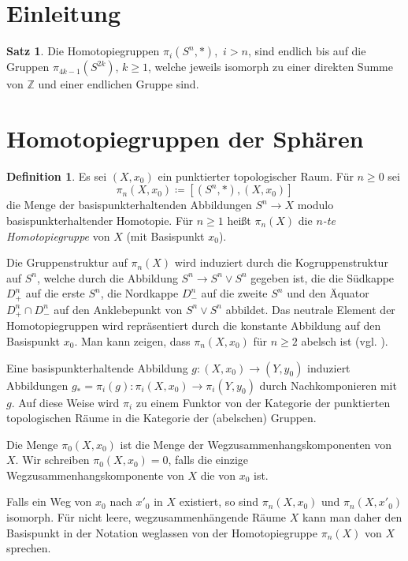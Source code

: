 \documentclass[11pt, a4paper, german]{article}
\theoremstyle{definition}
\newtheorem{satz}{Satz}
\newtheorem{defn}{Definition}
\theoremstyle{remark}
\newcommand{\Z}{\mathbb{Z}} %
\begin{document}


\tableofcontents
\newpage

\section{Einleitung}

\begin{satz}
  Die Homotopiegruppen $\pi_i(S^n, *)$,~$i > n$, sind endlich bis auf die Gruppen $\pi_{4k-1}(S^{2k})$, $k \geq 1$, welche jeweils isomorph zu einer direkten Summe von $\Z$ und einer endlichen Gruppe sind.
\end{satz}

\section{Homotopiegruppen der Sphären}

\begin{defn}
  Es sei $(X, x_0)$ ein punktierter topologischer Raum.
  Für $n \geq 0$ sei
  \[ \pi_n(X, x_0) \coloneqq [(S^n, *), (X, x_0)] \]
  die Menge der basispunkterhaltenden Abbildungen $S^n \to X$ modulo basispunkterhaltender Homotopie.
  Für $n \geq 1$ heißt $\pi_n(X)$ die \emph{$n$-te Homotopiegruppe} von $X$ (mit Basispunkt $x_0$).
\end{defn}

Die Gruppenstruktur auf $\pi_n(X)$ wird induziert durch die Kogruppenstruktur auf $S^n$, welche durch die Abbildung $S^n \to S^n \vee S^n$ gegeben ist, die die Südkappe $D^n_+$ auf die erste $S^n$, die Nordkappe $D^n_{-}$ auf die zweite $S^n$ und den Äquator $D^n_{+} \cap D^n_{-}$ auf den Anklebepunkt von $S^n \vee S^n$ abbildet.
Das neutrale Element der Homotopiegruppen wird repräsentiert durch die konstante Abbildung auf den Basispunkt $x_0$.
Man kann zeigen, dass $\pi_n(X, x_0)$ für $n \geq 2$ abelsch ist (vgl. \cite{hatcher:at}).

Eine basispunkterhaltende Abbildung $g : (X, x_0) \to (Y, y_0)$ induziert Abbildungen $g_* = \pi_i(g) : \pi_i(X, x_0) \to \pi_i(Y, y_0)$ durch Nachkomponieren mit $g$.
Auf diese Weise wird $\pi_i$ zu einem Funktor von der Kategorie der punktierten topologischen Räume in die Kategorie der (abelschen) Gruppen.

Die Menge $\pi_0(X, x_0)$ ist die Menge der Wegzusammenhangskomponenten von $X$.
Wir schreiben $\pi_0(X, x_0) = 0$, falls die einzige Wegzusammenhangskomponente von $X$ die von $x_0$ ist.

Falls ein Weg von $x_0$ nach $x'_0$ in $X$ existiert, so sind $\pi_n(X, x_0)$ und $\pi_n(X, x'_0)$ isomorph.
Für nicht leere, wegzusammenhängende Räume $X$ kann man daher den Basispunkt in der Notation weglassen von der Homotopiegruppe $\pi_n(X)$ von $X$ sprechen.
\end{document}
